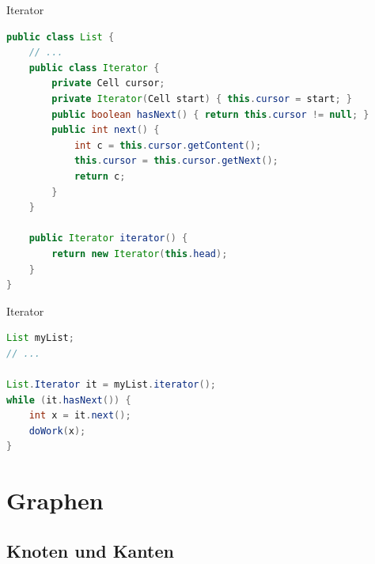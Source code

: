 \documentclass[18pt]{beamer}
\begin{document}
\begin{frame}[fragile]{Iterator}

    \begin{exampleblock}{}
        \begin{lstlisting}[language=Java,basicstyle=\scriptsize]
public class List {
    // ...
    public class Iterator {
        private Cell cursor;
        private Iterator(Cell start) { this.cursor = start; }
        public boolean hasNext() { return this.cursor != null; }
        public int next() {
            int c = this.cursor.getContent();
            this.cursor = this.cursor.getNext();
            return c;
        }
    }

    public Iterator iterator() {
        return new Iterator(this.head);
    }
}
        \end{lstlisting}

    \end{exampleblock}

\end{frame}

\begin{frame}[fragile]{Iterator}

    \begin{exampleblock}{}
        \begin{lstlisting}[language=Java]
List myList;
// ...

List.Iterator it = myList.iterator();
while (it.hasNext()) {
    int x = it.next();
    doWork(x);
}
        \end{lstlisting}

    \end{exampleblock}

\end{frame}

\appendix
\beginbackup

\section{Graphen}

\subsection{Knoten und Kanten}
\end{document}
